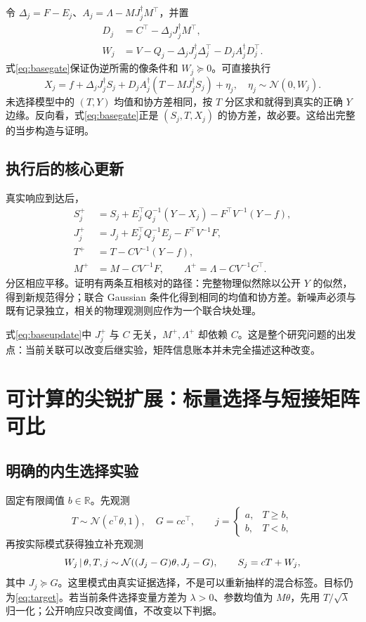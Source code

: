 \documentclass[UTF8,fontset=fandol,zihao=5,a4paper]{ctexart}
\newcommand{\R}{\mathbb R}\newcommand{\N}{\mathcal N}
\theoremstyle{definition}
\theoremstyle{remark}\newtheorem{remark}[theorem]{说明}
\numberwithin{equation}{section}
\begin{document}
令 $\Delta_j=F-E_j$、$A_j=\Lambda-MJ_j^\dagger M^\top$，并置
\begin{align}
D_j&=C^\top-\Delta_jJ_j^\dagger M^\top,\\
W_j&=V-Q_j-\Delta_jJ_j^\dagger\Delta_j^\top-D_jA_j^\dagger D_j^\top.
\end{align}
式\eqref{eq:basegate}保证伪逆所需的像条件和 $W_j\succeq0$。可直接执行
\begin{equation}
X_j=f+\Delta_jJ_j^\dagger S_j+
D_jA_j^\dagger(T-MJ_j^\dagger S_j)+\eta_j,
\quad\eta_j\sim\N(0,W_j).
\label{eq:basecontrol}
\end{equation}
未选择模型中的 $(T,Y)$ 均值和协方差相同，按 $T$ 分区求和就得到真实的正确 $Y$ 边缘。反向看，式\eqref{eq:basegate}正是 $(S_j,T,X_j)$ 的协方差，故必要。这给出完整的当步构造与证明。

\subsection{执行后的核心更新}
真实响应到达后，
\begin{align}
S_j^+&=S_j+E_j^\top Q_j^{-1}(Y-X_j)-F^\top V^{-1}(Y-f),\\
J_j^+&=J_j+E_j^\top Q_j^{-1}E_j-F^\top V^{-1}F,\\
T^+&=T-CV^{-1}(Y-f),\\
M^+&=M-CV^{-1}F,\qquad
\Lambda^+=\Lambda-CV^{-1}C^\top.
\label{eq:baseupdate}
\end{align}
分区相应平移。证明有两条互相核对的路径：完整物理似然除以公开 $Y$ 的似然，得到新规范得分；联合 Gaussian 条件化得到相同的均值和协方差。新噪声必须与既有记录独立，相关的物理观测则应作为一个联合块处理。

式\eqref{eq:baseupdate}中 $J_j^+$ 与 $C$ 无关，$M^+,\Lambda^+$ 却依赖 $C$。这是整个研究问题的出发点：当前关联可以改变后继实验，矩阵信息账本并未完全描述这种改变。



\section{可计算的尖锐扩展：标量选择与短接矩阵可比}
\label{sec:comparable}
\subsection{明确的内生选择实验}
固定有限阈值 $b\in\R$。先观测
\begin{equation}
T\sim\N(c^\top\theta,1),\quad G=cc^\top,\qquad
j=\begin{cases}a,&T\ge b,\\b,&T<b,\end{cases}
\label{eq:selector}
\end{equation}
再按实际模式获得独立补充观测
\begin{equation}
W_j\given\theta,T,j\sim\N((J_j-G)\theta,J_j-G),
\qquad S_j=cT+W_j,
\label{eq:complement}
\end{equation}
其中 $J_j\succeq G$。这里模式由真实证据选择，不是可以重新抽样的混合标签。目标仍为\eqref{eq:target}。若当前条件选择变量方差为 $\lambda>0$、参数均值为 $M\theta$，先用 $T/\sqrt\lambda$ 归一化；公开响应只改变阈值，不改变以下判据。
\end{document}

